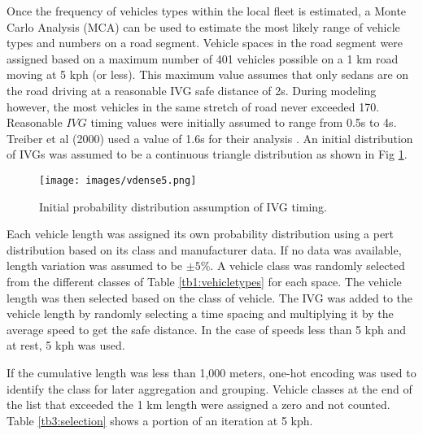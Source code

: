 \documentclass[preprint,12pt,a4paper,authoryear]{elsarticle}
\begin{document}
\begin{linenumbers}
Once the frequency of vehicles types within the local fleet is estimated, a Monte Carlo Analysis (MCA) can be used to estimate the most likely range of vehicle types and numbers on a road segment. Vehicle spaces in the road segment were assigned based on a maximum number of 401 vehicles possible on a 1 km road moving at 5 kph (or less).  This maximum value assumes that only sedans are on the road driving at a reasonable IVG safe distance of 2s.  During modeling however, the most vehicles in the same stretch of road never exceeded 170.  Reasonable $IVG$ timing values were initially assumed to range from 0.5s to 4s. Treiber et al (2000) used a value of 1.6s for their analysis \citep{Treiber2000}. An initial distribution of IVGs was assumed to be a continuous triangle distribution as shown in Fig \ref{fig5:IVGobs}.
 
%
\begin{figure}[H]
\texttt{[image: images/vdense5.png]} 
\caption{Initial probability distribution assumption of IVG timing.}
\label{fig5:IVGobs}
\end{figure}
%
Each vehicle length was assigned its own probability distribution using a pert distribution based on its class and manufacturer data.  If no data was available, length variation was assumed to be $\pm5\%$. A vehicle class was randomly selected from the different classes of Table \ref{tb1:vehicletypes} for each space.  The vehicle length was then selected based on the class of vehicle.  The IVG was added to the vehicle length by randomly selecting a time spacing and multiplying it by the average speed to get the safe distance. In the case of speeds less than 5 kph and at rest, 5 kph was used.  

If the cumulative length was less than 1,000 meters, one-hot encoding was used to identify the class for later aggregation and grouping.  Vehicle classes at the end of the list that exceeded the 1 km length were assigned a zero and not counted.  Table \ref{tb3:selection} shows a portion of an iteration at 5 kph. 


\end{linenumbers}
\end{document}
